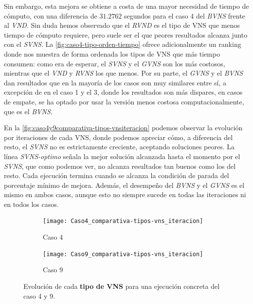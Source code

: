 Sin embargo, esta mejora se obtiene a costa de una mayor necesidad de tiempo de cómputo, con una diferencia de $31.2762$ segundos para el caso 4 del \textit{BVNS} frente al \textit{VND}. Sin duda hemos observado que el \textit{RVND} es el tipo de VNS que menos tiempo de cómputo requiere, pero suele ser el que peores resultados alcanza junto con el \textit{SVNS}. La \autoref{fig:caso4-tipo-orden-tiempo} ofrece adicionalmente un ranking donde nos muestra de forma ordenada los tipos de VNS que más tiempo consumen: como era de esperar, el \textit{SVNS} y el \textit{GVNS} son los más costosos, mientras que el \textit{VND} y \textit{RVNS} los que menos. Por su parte, el \textit{GVNS} y el \textit{BVNS} dan resultados que en la mayoría de los casos son muy similares entre sí, a excepción de en el caso 1 y el 3, donde los resultados son más dispares, en casos de empate, se ha optado por usar la versión menos costosa computacionalmente, que es el \textit{BVNS}.

En la \autoref{fig:caso4y9comparativa-tipos-vnsiteracion} podemos observar la evolución por iteraciones de cada VNS, donde podemos apreciar cómo, a diferencia del resto, el \textit{SVNS} no es estrictamente creciente, aceptando soluciones peores. La línea \textit{SVNS-optimo} señala la mejor solución alcanzada hasta el momento por el \textit{SVNS}, que como podemos ver, no alcanza resultados tan buenos como los del resto. Cada ejecución termina cuando se alcanza la condición de parada del porcentaje mínimo de mejora. Además, el desempeño del \textit{BVNS} y el \textit{GVNS} es el mismo en ambos casos, aunque esto no siempre sucede en todas las iteraciones ni en todos los casos.

\begin{figure}
	\begin{subfigure}{\linewidth}
		\centering
		\texttt{[image: Caso4\_comparativa-tipos-vns\_iteracion]}
		\caption{Caso 4}
		\label{fig:caso4comparativa-tipos-vnsiteracion}
	\end{subfigure}

	\begin{subfigure}{\linewidth}
		\centering
		\texttt{[image: Caso9\_comparativa-tipos-vns\_iteracion]}
		\caption{Caso 9}
		\label{fig:caso9comparativa-tipos-vnsiteracion}
	\end{subfigure}
	\caption{Evolución de cada \textbf{tipo de VNS} para una ejecución concreta del caso 4 y 9.}
	\label{fig:caso4y9comparativa-tipos-vnsiteracion}
\end{figure}

